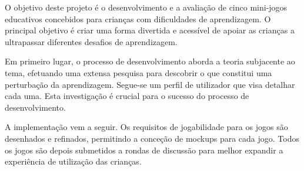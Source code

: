 


O objetivo deste projeto é o desenvolvimento e a avaliação de cinco mini-jogos educativos concebidos para crianças com dificuldades de aprendizagem. O principal objetivo é criar uma forma divertida e acessível de apoiar as crianças a ultrapassar diferentes desafios de aprendizagem.

Em primeiro lugar, o processo de desenvolvimento aborda a teoria subjacente ao tema, efetuando uma extensa pesquisa para descobrir o que constitui uma perturbação da aprendizagem. Segue-se um perfil de utilizador que visa detalhar cada uma. Esta investigação é crucial para o sucesso do processo de desenvolvimento.

A implementação vem a seguir. Os requisitos de jogabilidade para os jogos são desenhados e refinados, permitindo a conceção de mockups para cada jogo. Todos os jogos são depois submetidos a rondas de discussão para melhor expandir a experiência de utilização das crianças.

